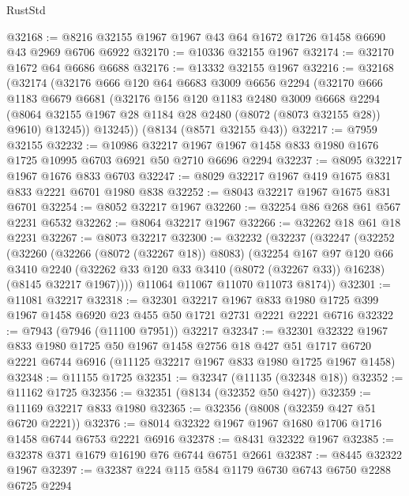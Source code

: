 \begin{lexlean}{RustStd}
\begin{coremodule}
{\begin{coremodule}
{{{{{{{{{{{{{{{{{{{{{{{{{{{{{{{{{{{{{{{{{{{{{{{{{{{{{@32168 := @8216 @32155 @1967 @1967 @43 @64 @1672 @1726 @1458 @6690 @43 @2969 @6706 @6922
@32170 := @10336 @32155 @1967
@32174 := @32170 @1672 @64 @6686 @6688
@32176 := @13332 @32155 @1967
@32216 := @32168
    (@32174
      (@32176
        @666
        @120
        @64
        @6683
        @3009
        @6656
        @2294
        (@32170
          @666
          @1183
          @6679
          @6681
          (@32176
            @156
            @120
            @1183
            @2480
            @3009
            @6668
            @2294
            (@8064 @32155 @1967 @28 @1184 @28 @2480 (@8072 (@8073 @32155 @28)) @9610)
            @13245))
        @13245))
    (@8134 (@8571 @32155 @43))
@32217 := @7959 @32155
@32232 := @10986
    @32217
    @1967
    @1967
    @1458
    @833
    @1980
    @1676
    @1725
    @10995
    @6703
    @6921
    @50
    @2710
    @6696
    @2294
@32237 := @8095 @32217 @1967 @1676 @833 @6703
@32247 := @8029 @32217 @1967 @419 @1675 @831 @833 @2221 @6701 @1980 @838
@32252 := @8043 @32217 @1967 @1675 @831 @6701
@32254 := @8052 @32217 @1967
@32260 := @32254 @86 @268 @61 @567 @2231 @6532
@32262 := @8064 @32217 @1967
@32266 := @32262 @18 @61 @18 @2231
@32267 := @8073 @32217
@32300 := @32232
    (@32237
      (@32247
        (@32252
          (@32260
            (@32266 (@8072 (@32267 @18)) @8083)
            (@32254
              @167
              @97
              @120
              @66
              @3410
              @2240
              (@32262 @33 @120 @33 @3410 (@8072 (@32267 @33)) @16238)
              (@8145 @32217 @1967))))
        @11064
        @11067
        @11070
        @11073
        @8174))
@32301 := @11081 @32217
@32318 := @32301
    @32217
    @1967
    @833
    @1980
    @1725
    @399
    @1967
    @1458
    @6920
    @23
    @455
    @50
    @1721
    @2731
    @2221
    @2221
    @6716
@32322 := @7943 (@7946 (@11100 @7951)) @32217
@32347 := @32301
    @32322
    @1967
    @833
    @1980
    @1725
    @50
    @1967
    @1458
    @2756
    @18
    @427
    @51
    @1717
    @6720
    @2221
    @6744
    @6916
    (@11125 @32217 @1967 @833 @1980 @1725 @1967 @1458)
@32348 := @11155 @1725
@32351 := @32347 (@11135 (@32348 @18))
@32352 := @11162 @1725
@32356 := @32351 (@8134 (@32352 @50 @427))
@32359 := @11169 @32217 @833 @1980
@32365 := @32356 (@8008 (@32359 @427 @51 @6720 @2221))
@32376 := @8014 @32322 @1967 @1967 @1680 @1706 @1716 @1458 @6744 @6753 @2221 @6916
@32378 := @8431 @32322 @1967
@32385 := @32378 @371 @1679 @16190 @76 @6744 @6751 @2661
@32387 := @8445 @32322 @1967
@32397 := @32387 @224 @115 @584 @1179 @6730 @6743 @6750 @2288 @6725 @2294
}}}}}}}}}}}}}}}}}}}}}}}}}}}}}}}}}}}}}}}}}}}}}}}}}}}}}
\end{coremodule}}
\end{coremodule}
\end{lexlean}
